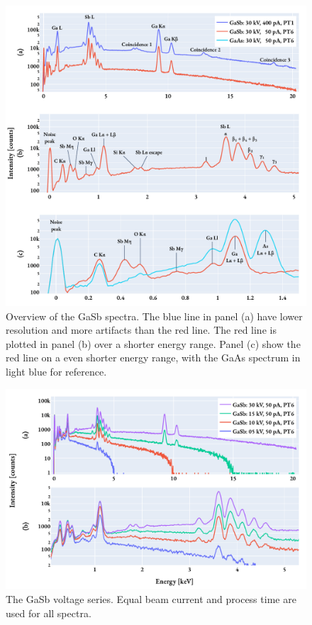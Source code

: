 \begin{figure}[hbtp]
    \centering
    \includegraphics[width=0.95\linewidth]{figures/results/spectrum_overviews.pdf}
    \caption{
        Overview of the GaSb spectra.
        The blue line in panel (a) have lower resolution and more artifacts than the red line.
        The red line is plotted in panel (b) over a shorter energy range.
        Panel (c) show the red line on a even shorter energy range, with the GaAs spectrum in light blue for reference.
    }
    \label{fig:results:overviewGaSb_withArtifacts}
\end{figure}


\begin{figure}[hbtp]
    \centering
    \includegraphics[width=0.9\linewidth]{figures/results/GaSb_voltages.pdf}
    \caption{
        The GaSb voltage series.
        Equal beam current and process time are used for all spectra.
    }
    \label{fig:results:GaSb_voltages}
\end{figure}


